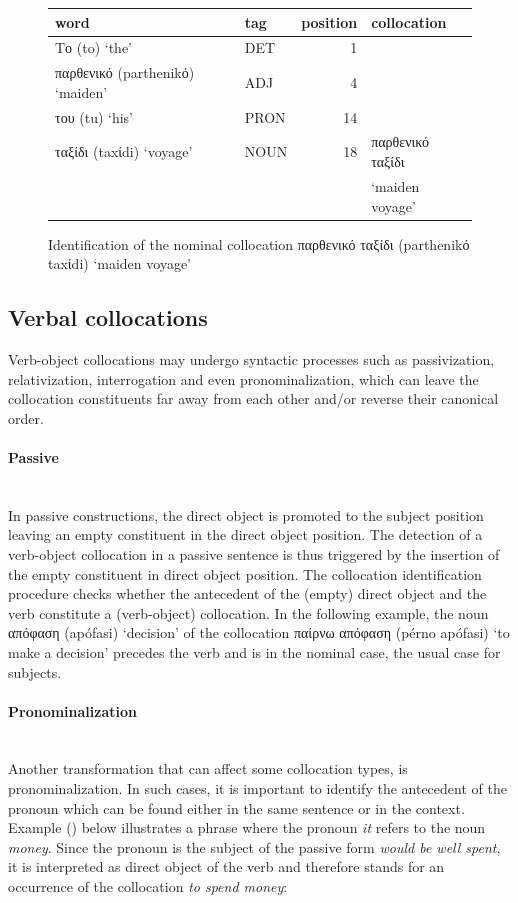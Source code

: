 \documentclass[output=paper]{langsci/langscibook}
\begin{document}
\begin{figure}[h]
  {\small
\begin{tabular}{llrl}
word & tag & position & collocation \\ \hline
{Το} (to) `the' & DET & 1\\
{παρθενικό} (parthenikό) `maiden' & ADJ & 4 \\
{του } (tu) `his' & PRON & 14 \\
{ταξίδι} (taxίdi) `voyage' & NOUN & 18 & {παρθενικό ταξίδι} \\
& & & `maiden voyage'
\end{tabular}
  }
\caption{\label{fig1}Identification of the nominal collocation {παρθενικό ταξίδι} (parthenikό taxίdi) `maiden voyage'}
\end{figure} 


\subsection{Verbal collocations}
Verb-object collocations may undergo syntactic processes such as passivization, relativization, interrogation and even pronominalization, which can leave the collocation constituents far away from each other and/or reverse their canonical order.



\paragraph*{Passive} {~~~} \\
In passive constructions, the direct object is promoted to the subject position leaving an empty constituent in the direct object position. The detection of a verb-object collocation in a passive sentence is thus triggered by the insertion of the empty constituent in direct object position. The collocation identification procedure checks whether the antecedent of the (empty) direct object and the verb constitute a (verb-object) collocation.
In the following example, the noun  {απόφαση} (apófasi) `decision' of the collocation {παίρνω απόφαση} (pérno apófasi) `to make a decision'  precedes the verb and is in the nominal case, the usual case for subjects.

 

\paragraph*{Pronominalization}  {~~~} \\
Another transformation that can affect some collocation types, is pronominalization.  In such cases, it is important to identify the antecedent of the pronoun which can be found either in the same sentence or in the context. Example () below illustrates a phrase where the pronoun \textit{it} refers to the noun \textit{money}. Since the pronoun is the subject of the passive form \textit{would be well spent}, it is interpreted as direct object of the verb and therefore stands for an occurrence of the collocation \textit{to spend money}:
\end{document}
